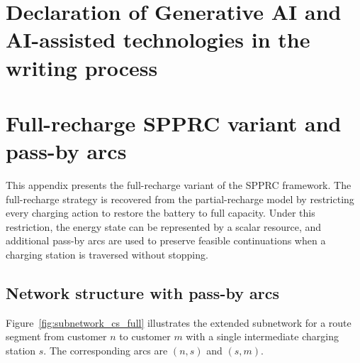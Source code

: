 \documentclass[3p,11pt,authoryear]{elsarticle}  %
\begin{document}

\section*{Declaration of Generative AI and AI-assisted technologies in the writing process}






\appendix
\newpage





\section{Full-recharge SPPRC variant and pass-by arcs}
\label{app:full_recharge_spprc}



This appendix presents the full-recharge variant of the SPPRC framework. The full-recharge strategy is recovered from the partial-recharge model by restricting every charging action to restore the battery to full capacity. Under this restriction, the energy state can be represented by a scalar resource, and additional pass-by arcs are used to preserve feasible continuations when a charging station is traversed without stopping.


\subsection{Network structure with pass-by arcs}


Figure~\ref{fig:subnetwork_cs_full} illustrates the extended subnetwork for a route segment from customer \(n\) to customer \(m\) with a single intermediate charging station \(s\). The corresponding arcs are \((n,s)\) and \((s,m)\).
\end{document}
